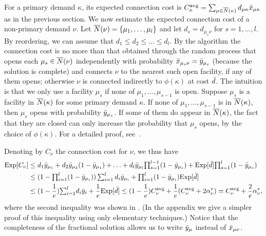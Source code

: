 For a primary demand $\kappa$, its expected connection cost
is $C^{\mbox{\scriptsize\rm avg}}_{\kappa} = \sum_{\mu\in{\overline{N}}(\kappa)} d_{\mu\kappa}{\bar x}_{\mu\kappa}$
as in the previous section. We now estimate the expected
connection cost of a non-primary demand $\nu$. Let
${\overline{N}}(\nu) = { \left\{ \mu_1,\ldots,\mu_l \right\} }$ and let $d_s =
d_{\mu_s\nu}$ for $s = 1,\ldots,l$. By reordering, we can
assume that $d_1 \le d_2 \le \ldots \le d_l$. By the
algorithm the connection cost is no more than that obtained
through the random process that opens each $\mu_s\in
{\overline{N}}(\nu)$ independently with probability ${\bar x}_{\mu_s
  \nu} ={\bar y}_{\mu_s}$ (because the solution is complete)
and connects $\nu$ to the nearest such open facility, if any
of them opens; otherwise $\nu$ is connected indirectly to
$\phi(\kappa)$ at cost ${\bar d}$. The intuition is that we
only use a facility $\mu_s$ if none of
$\mu_1,\ldots,\mu_{s-1}$ is open. Suppose $\mu_s$ is a
facility in ${\overline{N}}(\kappa)$ for some primary demand
$\kappa$. If none of $\mu_1,\ldots,\mu_{s-1}$ is in
${\overline{N}}(\kappa)$, then $\mu_s$ opens with probability
${\bar y}_{\mu_s}$. If some of them do appear in
${\overline{N}}(\kappa)$, the fact that they are closed can only
increase the probability that $\mu_s$ opens, by the choice
of $\phi(\kappa)$.  For a detailed proof,
see~\cite{ChudakS04}.

Denoting by $C_\nu$ the connection cost for $\nu$, we thus have
%
\begin{align*}
  \mbox{\rm Exp}[C_\nu] &\leq d_1 {\bar y}_{\mu_1} + d_2 {\bar y}_{\mu_2}(1-{\bar y}_{\mu_1}) + \ldots
 		+  d_l {\bar y}_{\mu_l}\textstyle{\prod_{s=1}^{l-1}}(1-{\bar y}_{\mu_s}) 
		+  \mbox{\rm Exp}[{\bar d}]\textstyle{\prod_{s=1}^{l}} (1-{\bar y}_{\mu_s})
		\\
  &\leq (1-\textstyle{\prod_{i=1}^l} (1-{\bar y}_{\mu_i}))
  	\sum_{i=1}^l d_i{\bar y}_{\mu_i} + {\textstyle\prod_{i=1}^l} (1-\bar  y_{\mu_i})\mbox{\rm Exp}[{\bar d}]
	\\
  &\leq (1-\frac{1}{e}) {\textstyle\sum_{i=1}^l} d_i{\bar y}_i 
	+ \frac{1}{e} \mbox{\rm Exp}[{\bar d}] \leq (1-\frac{1}{e}) C^{{\mbox{\scriptsize\rm avg}}}_{\nu} 
	+	\frac{1}{e}	(C^{{\mbox{\scriptsize\rm avg}}}_{\nu} + 2\alpha_{\nu}^\ast) = C^{{\mbox{\scriptsize\rm avg}}}_{\nu} + \frac{2}{e}\alpha_{\nu}^\ast,
\end{align*}
%
where the second inequality was shown in
\cite{ChudakS04}. (In the appendix we give a simpler
proof of this inequality using only elementary techniques.)  Notice that the
completeness of the fractional solution allows us to write
${\bar y}_{\mu}$ instead of ${\bar x}_{\mu\nu}$.

